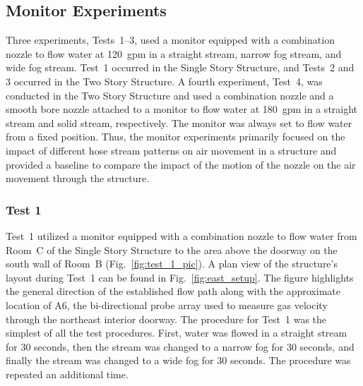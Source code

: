\documentclass[12pt,oneside]{book}
\begin{document}
\subsection{Monitor Experiments}
\label{sec:monitor_procedure}
Three experiments, Tests~1--3, used a monitor equipped with a combination nozzle to flow water at 120~gpm in a straight stream, narrow fog stream, and wide fog stream. Test~1 occurred in the Single Story Structure, and Tests~2 and 3 occurred in the Two Story Structure. A fourth experiment, Test~4, was conducted in the Two Story Structure and used a combination nozzle and a smooth bore nozzle attached to a monitor to flow water at 180~gpm in a straight stream and solid stream, respectively. The monitor was always set to flow water from a fixed position. Thus, the monitor experiments primarily focused on the impact of different hose stream patterns on air movement in a structure and provided a baseline to compare the impact of the motion of the nozzle on the air movement through the structure.

\subsubsection{Test 1}
Test~1 utilized a monitor equipped with a combination nozzle to flow water from Room~C of the Single Story Structure to the area above the doorway on the south wall of Room~B (Fig.~\ref{fig:test_1_pic}). A plan view of the structure's layout during Test~1 can be found in Fig.~\ref{fig:east_setup}. The figure highlights the general direction of the established flow path along with the approximate location of A6, the bi-directional probe array used to measure gas velocity through the northeast interior doorway. The procedure for Test~1 was the simplest of all the test procedures. First, water was flowed in a straight stream for 30 seconds, then the stream was changed to a narrow fog for 30 seconds, and finally the stream was changed to a wide fog for 30 seconds. The procedure was repeated an additional time.
\end{document}
